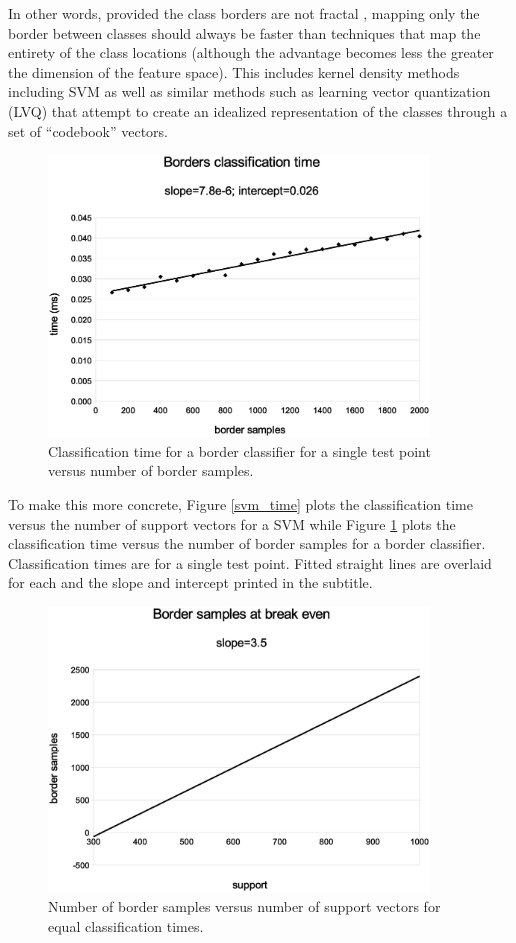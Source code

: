 In other words, provided the class borders are not fractal \citep{Ott1993}, 
mapping only the border between classes should always be
faster than techniques that map the entirety of the class locations
(although the advantage becomes less the greater the dimension of the feature
space).
This includes kernel density methods including SVM as well
as similar methods such as learning vector quantization (LVQ) 
\citep{Kohonen2000,LVQ_PAK}
that attempt to create an idealized representation of the classes through
a set of ``codebook'' vectors.

\begin{figure}
\includegraphics[width=0.9\textwidth]{border_time}
\caption{Classification time for a border classifier for a single test point versus number of border samples.}
\label{border_time}
\end{figure}

To make this more concrete, Figure \ref{svm_time}
plots the classification time versus the number of support vectors
for a SVM
while Figure \ref{border_time} plots the classification time
versus the number of border samples for a border classifier.
Classification times are for a single test point.
Fitted straight lines are overlaid for each and the slope and intercept 
printed in the subtitle.

\begin{figure}
\includegraphics[width=0.9\textwidth]{break_even}
\caption{Number of border samples versus number of support vectors for equal classification times.}
\label{break_even}
\end{figure}


